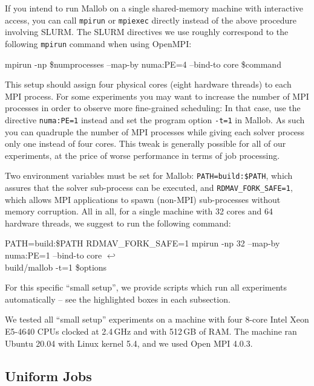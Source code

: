 \documentclass[runningheads]{article}
\newcommand{\CR}{{\tiny$\hookleftarrow$}}
\numberwithin{dummy}{subsection}
\begin{document}
If you intend to run Mallob on a single shared-memory machine with interactive access, you can call \texttt{mpirun} or \texttt{mpiexec} directly instead of the above procedure involving SLURM.
The SLURM directives we use roughly correspond to the following \texttt{mpirun} command when using OpenMPI:

\begin{ttfenv}
 mpirun -np \$numprocesses --map-by numa:PE=4 --bind-to core \$command
\end{ttfenv}

This setup should assign four physical cores (eight hardware threads) to each MPI process.
For some experiments you may want to increase the number of MPI processes in order to observe more fine-grained scheduling: In that case, use the directive \texttt{numa:PE=1} instead and set the program option \texttt{-t=1} in Mallob.
As such you can quadruple the number of MPI processes while giving each solver process only one instead of four cores.
This tweak is generally possible for all of our experiments, at the price of worse performance in terms of job processing.

Two environment variables must be set for Mallob: \texttt{PATH=build:\$PATH}, which assures that the solver sub-process can be executed, and \texttt{RDMAV\_FORK\_SAFE=1}, which allows MPI applications to spawn (non-MPI) sub-processes without memory corruption.
All in all, for a single machine with 32 cores and 64 hardware threads, we suggest to run the following command:

\begin{ttfenv}
PATH=build:\$PATH RDMAV\_FORK\_SAFE=1 mpirun -np 32 --map-by numa:PE=1 --bind-to core \CR\\
build/mallob -t=1 \$options
\end{ttfenv}

For this specific ``small setup'', we provide scripts which run all experiments automatically -- see the highlighted boxes in each subsection.

We tested all ``small setup'' experiments on a machine with four 8-core Intel Xeon E5-4640 CPUs clocked at 2.4\,GHz and with 512\,GB of RAM.
The machine ran Ubuntu 20.04 with Linux kernel 5.4, and we used Open MPI 4.0.3.








\subsection{Uniform Jobs}
\label{sec:uniform-jobs}
\end{document}
